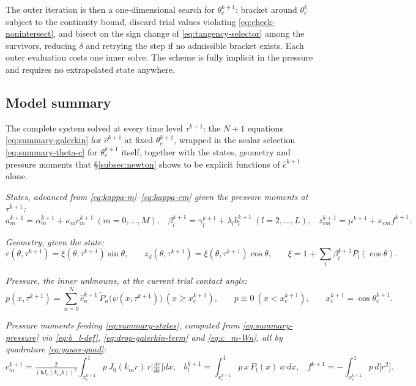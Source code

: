 The outer iteration is then a one-dimensional search for $\theta_c^{k+1}$: bracket around $\theta_c^k$ subject to the continuity bound, discard trial values violating \eqref{eq:check-nonintersect}, and bisect on the sign change of \eqref{eq:tangency-selector} among the survivors, reducing $\delta$ and retrying the step if no admissible bracket exists. Each outer evaluation costs one inner solve. The scheme is fully implicit in the pressure and requires no extrapolated state anywhere.

\subsection{Model summary}
\label{subsec:summary}

The complete system solved at every time level $\tau^{k+1}$: the $N+1$ equations \eqref{eq:summary-galerkin} for $\hat c^{k+1}$ at fixed $\theta_c^{k+1}$, wrapped in the scalar selection \eqref{eq:summary-theta-c} for $\theta_c^{k+1}$ itself, together with the states, geometry and pressure moments that \S\ref{subsec:newton} shows to be explicit functions of $\hat c^{k+1}$ alone.

\emph{States, advanced from \eqref{eq:kappa-m}--\eqref{eq:kappa-cm} given the pressure moments at $\tau^{k+1}$:}
\begin{equation}
    a_m^{k+1}=\alpha_m^{k+1}+\kappa_mc_m^{k+1}\ (m=0,\dots,M)\text{,}\quad
    \beta_l^{k+1}=\gamma_l^{k+1}+\lambda_lb_l^{k+1}\ (l=2,\dots,L)\text{,}\quad
    z_{cm}^{k+1}=\mu^{k+1}+\kappa_{cm}f^{k+1}\text{.}
    \label{eq:summary-states}
\end{equation}

\emph{Geometry, given the state:}
\begin{equation}
    r(\theta,\tau^{k+1})=\xi(\theta,\tau^{k+1})\sin\theta\text{,}\qquad z_d(\theta,\tau^{k+1})=\xi(\theta,\tau^{k+1})\cos\theta\text{,}\qquad
    \xi=1+\textstyle\sum_l\beta_l^{k+1}P_l(\cos\theta)\text{.}
    \label{eq:summary-geometry}
\end{equation}

\emph{Pressure, the inner unknowns, at the current trial contact angle:}
\begin{equation}
    p(x,\tau^{k+1})=\sum_{n=0}^N\hat c_n^{k+1}\,\tilde P_n\big(\psi(x,\tau^{k+1})\big)\ (x\ge x_c^{k+1})\text{,}\qquad p\equiv0\ (x<x_c^{k+1})\text{,}\qquad x_c^{k+1}=\cos\theta_c^{k+1}\text{.}
    \label{eq:summary-pressure}
\end{equation}

\emph{Pressure moments feeding \eqref{eq:summary-states}, computed from \eqref{eq:summary-pressure} via \eqref{eq:b_l-def}, \eqref{eq:drop-galerkin-term} and \eqref{eq:c_m-Wn}, all by quadrature \eqref{eq:gauss-quad}:}
\begin{equation}
    c_m^{k+1}=\tfrac{2}{(bJ_0(k_mb))^2}\!\int_{x_c^{k+1}}^1\! p\,J_0(k_mr)\,r\Big|\tfrac{dr}{dx}\Big|dx\text{,}\quad
    b_l^{k+1}=\!\int_{x_c^{k+1}}^1\! p\,x\,P_l(x)\,w\,dx\text{,}\quad
    f^{k+1}=-\!\int_{x_c^{k+1}}^1\! p\,d\big[r^2\big]\text{.}
    \label{eq:summary-moments}
\end{equation}

